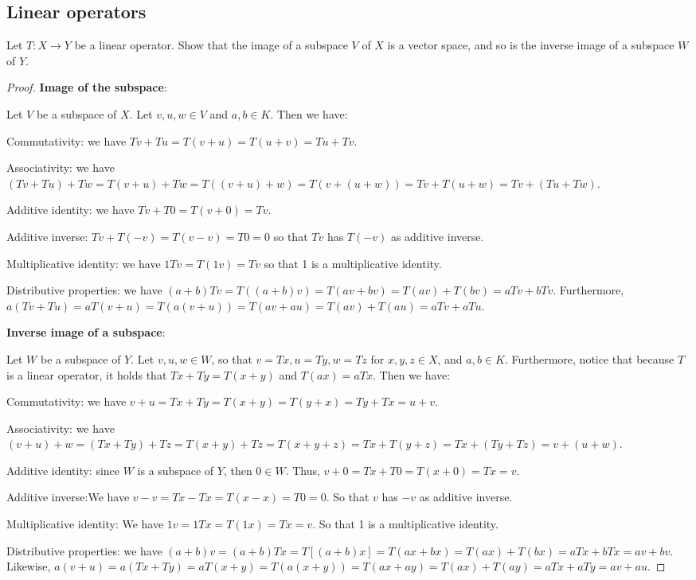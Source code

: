 \subsection{Linear operators}


\begin{exercise}{5}
Let $T:X\to Y$ be a linear operator. Show that the image of a subspace $V$ of $X$ is a vector space, and so is the inverse image of a subspace $W$ of $Y$.
\end{exercise}
\begin{proof}
\textbf{Image of the subspace}:

Let $V$ be a subspace of $X$. Let $v,u,w\in V$ and $a,b\in K$. Then we have:

Commutativity: we have $Tv+Tu =T(v+u) = T(u+v) =Tu+Tv$.

Associativity: we have $(Tv+Tu)+Tw =T(v+u)+Tw =T((v+u)+w) =T(v+(u+w)) =Tv+T(u+w) =Tv+(Tu+Tw)$.

Additive identity: we have $Tv+T0 =T(v+0) =Tv$.

Additive inverse: $Tv+T(-v) =T(v-v) =T0 =0$ so that $Tv$ has $T(-v)$ as additive inverse.

Multiplicative identity: we have $1Tv= T(1v) =Tv$ so that 1 is a multiplicative identity.

Distributive properties: we have $(a+b)Tv =T((a+b)v) =T(av+bv) =T(av)+T(bv) =aTv+bTv$. Furthermore, $a(Tv+Tu) =aT(v+u) =T(a(v+u)) =T(av+au) =T(av)+T(au) =aTv+aTu$.

\textbf{Inverse image of a subspace}:

Let $W$ be a subspace of $Y$. Let $v,u,w\in W$, so that $v=Tx, u=Ty, w=Tz$ for $x,y,z\in X$, and $a,b\in K$. Furthermore, notice that because $T$ is a linear operator, it holds that $Tx+Ty =T(x+y)$ and $T(ax) =aTx$. Then we have:

Commutativity: we have $v+u =Tx+Ty =T(x+y) =T(y+x) =Ty+Tx =u+v$.

Associativity: we have $(v+u)+w =(Tx+Ty)+Tz =T(x+y)+Tz =T(x+y+z) =Tx+T(y+z) =Tx+(Ty+Tz) =v+(u+w)$.

Additive identity: since $W$ is a subspace of $Y$, then $0\in W$. Thus, $v+0 =Tx+T0 =T(x+0) =Tx =v$.

Additive inverse:We have $v-v =Tx-Tx =T(x-x) =T0 =0$. So that $v$ has $-v$ as additive inverse.

Multiplicative identity: We have $1v =1Tx =T(1x) =Tx =v$. So that 1 is a multiplicative identity.

Distributive properties: we have $(a+b)v =(a+b)Tx =T[(a+b)x] =T(ax+bx) =T(ax)+T(bx) =aTx +bTx =av+bv$. Likewise, $a(v+u) =a(Tx+Ty) =aT(x+y) =T(a(x+y)) =T(ax+ay) =T(ax)+T(ay) =aTx+aTy =av+au$. 
\end{proof}

